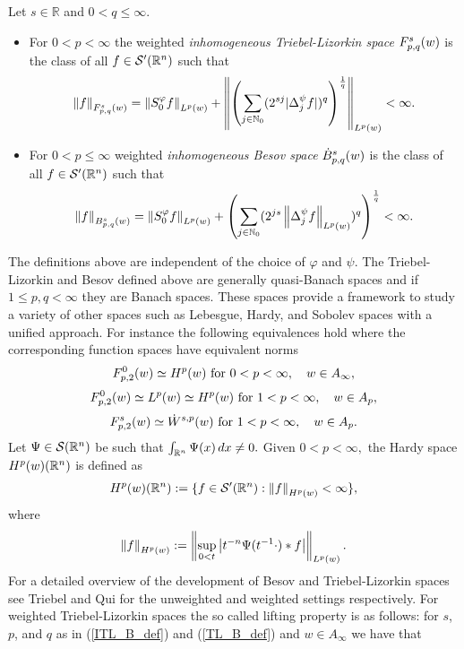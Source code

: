 \begin{dfn}\label{ITL_B_def}
Let $s\in\mathbb{R}$ and $0<q\leq\infty$.
\begin{itemize}
\item For $0<p<\infty$ the weighted \textit{inhomogeneous Triebel-Lizorkin space} $\itlw{p}{s}{q}{w}$ is the class of all $f\in\mathcal{S}'(\rn)$ such that
\begin{equation*}
\norm{f}{\itlw{p}{s}{q}{w}}= \norm{S^\varphi_0 f}{L^p(w)} + \norm{\left(\sum_{j\in\naz}(2^{sj}|\Delta^\psi_jf|)^q\right)^{\frac{1}{q}}}{\lebw{p}{w}}<\infty.
\end{equation*}
\item For $0<p\leq\infty$ weighted \textit{inhomogeneous Besov space} $\besw{p}{s}{q}{w}$ is the class of all $f\in\mathcal{S}'(\rn)$ such that 
\begin{equation*}
\norm{f}{\ibesw{p}{s}{q}{w}} = \norm{S^\varphi_0 f}{L^p(w)} + \left(\sum_{j\in\naz} (2^{js}\norm{\Delta^\psi_jf}{L^p(w)})^q\right)^{\frac{1}{q}} < \infty.
\end{equation*}
\end{itemize}
\end{dfn}

The definitions above are independent of the choice of $\varphi$ and $\psi$. The Triebel-Lizorkin and Besov defined above are generally quasi-Banach spaces and if $1\leq p,q <\infty$ they are Banach spaces. These spaces provide a framework to study a variety of other spaces such as Lebesgue, Hardy, and Sobolev spaces with a unified approach.  For instance the following equivalences hold where the corresponding function spaces have equivalent norms 
\begin{equation}\label{TL&Hardy}
 \itlw{p}{0}{2}{w} \simeq H^p (w) \text{ for } 0<p<\infty, \quad w\in A_\infty, 
\end{equation}
\begin{equation}
 \itlw{p}{0}{2}{w} \simeq L^p(w) \simeq H^p(w) \text{ for } 1<p<\infty, \quad w\in A_p, 
\end{equation}
\begin{equation}
 \itlw{p}{s}{2}{w} \simeq \dot{W}^{s,p}(w) \text{ for } 1<p<\infty, \quad w\in A_p.
\end{equation}
Let $\Psi\in \sw$ be such that $\int_{\rn}\Psi(x)\dx\neq 0.$ Given $0<p<\infty,$ the  Hardy space $H^p(w)(\rn)$ is defined as 
\begin{equation*}
H^p(w)(\re^n) :=\{f \in \swp: \norm{f}{H^p(w)}< \infty \},
\end{equation*}
where 
\[
\norm{f}{H^p(w)}:= \norm{\sup_{0<t} \abs{t^{-n}\Psi(t^{-1}\cdot)\ast f}}{L^p(w)} .
\]
For a detailed overview of the development of Besov and Triebel-Lizorkin spaces see Triebel \cite{MR3024598} and Qui \cite{MR676560} for the unweighted and weighted settings respectively.
For weighted Triebel-Lizorkin spaces the so called lifting property is as follows: for $s$, $p$, and $q$ as in (\ref{ITL_B_def}) and (\ref{TL_B_def}) and $w\in A_\infty$ we have that 

